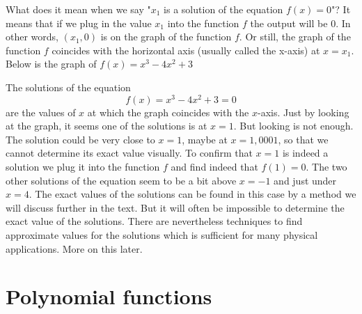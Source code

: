 \noindent What does it mean when we say "$x_1$ is a solution of the equation $f(x) = 0$"? It means that if we plug in the value $x_1$ into the function $f$ the output will be $0$. In other words, $\left( x_1, 0 \right)$ is on the graph of the function $f$. Or still, the graph of the function $f$ coincides with the horizontal axis (usually called the x-axis) at $x = x_1$. Below is the graph of $f(x) = x^3 - 4 x^2 + 3$
\begin{center}
\end{center}
The solutions of the equation
$$
f(x) = x^3 - 4x^2 + 3 = 0
$$
are the values of $x$ at which the graph coincides with the $x$-axis. Just by looking at the graph, it seems one of the solutions is at $x=1$. But looking is not enough. The solution could be very close to $x=1$, maybe at $x=1,0001$, so that we cannot determine its exact value visually. To confirm that $x=1$ is indeed a solution we plug it into the function $f$ and find indeed that $f(1)=0$. The  two other solutions of the equation seem to be a bit above $x=-1$ and just under $x=4$. The exact values of the solutions can be found in this case by a method we will discuss further in the text. But it will often be impossible to determine the exact value of the solutions. There are nevertheless techniques to find approximate values for the solutions which is sufficient for many physical applications. More on this later.

\section{Polynomial functions}

